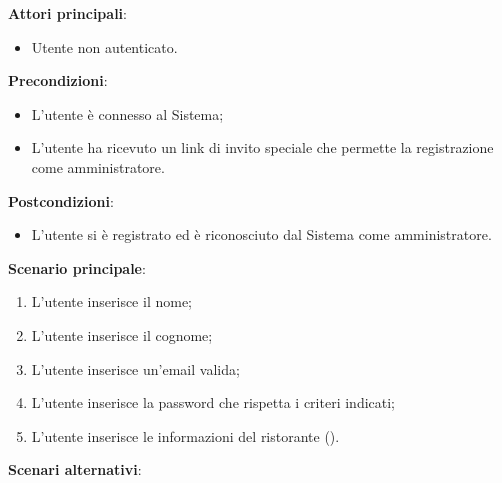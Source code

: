 \textbf{Attori principali}: 
\begin{itemize}
    \item Utente non autenticato.
\end{itemize}
\textbf{Precondizioni}:
\begin{itemize}
    \item L'utente è connesso al Sistema;
    \item L'utente ha ricevuto un link di invito speciale che permette la registrazione come amministratore.
\end{itemize}
\textbf{Postcondizioni}: 
\begin{itemize}
    \item L'utente si è registrato ed è riconosciuto dal Sistema come amministratore.
\end{itemize}
\textbf{Scenario principale}:
\begin{enumerate}
    \item L'utente inserisce il nome;
    \item L'utente inserisce il cognome;
    \item L'utente inserisce un'email valida;
    \item L'utente inserisce la password che rispetta i criteri indicati;
    \item L'utente inserisce le informazioni del ristorante ().
\end{enumerate}
\textbf{Scenari alternativi}:
